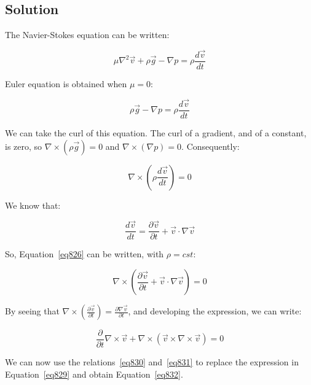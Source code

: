 \subsection{Solution}

The Navier-Stokes equation can be written:

\begin{equation}\label{eq824}
\mu \nabla^2 \vec{v} + \rho \vec{g} - \nabla p = \rho \frac{d\vec{v}}{dt}
\end{equation}

Euler equation is obtained when $\mu = 0$:

\begin{equation}\label{eq825}
\rho \vec{g} - \nabla p = \rho \frac{d\vec{v}}{dt}
\end{equation}

We can take the curl of this equation. The curl of a gradient, and of a constant, is zero, so $\nabla \times (\rho \vec{g}) = 0$ and $\nabla \times (\nabla p) = 0$. Consequently:

\begin{equation}\label{eq826}
\nabla \times \left( \rho \frac{d\vec{v}}{dt} \right) = 0
\end{equation}

We know that:

\begin{equation}\label{eq827}
\frac{d\vec{v}}{dt} = \frac{\partial \vec{v}}{\partial t} + \vec{v} \cdot \nabla \vec{v}
\end{equation}

So, Equation~\ref{eq826} can be written, with $\rho = cst$:

\begin{equation}\label{eq828}
\nabla \times \left( \frac{\partial \vec{v}}{\partial t} + \vec{v} \cdot \nabla \vec{v} \right) = 0
\end{equation}

By seeing that $\nabla \times \left( \frac{\partial \vec{v}}{\partial t} \right) = \frac{\partial \nabla \vec{v}}{\partial t}$, and developing the expression, we can write:


\begin{equation}\label{eq829}
\frac{\partial}{\partial t}\nabla \times \vec{v} + \nabla \times (\vec{v} \times \nabla \times \vec{v}) = 0
\end{equation}

We can now use the relations~\ref{eq830} and~\ref{eq831} to replace the expression in Equation~\ref{eq829} and obtain Equation~\ref{eq832}.

